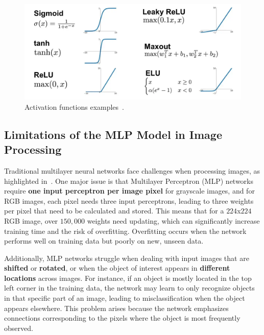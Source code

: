 \begin{figure}[!htb]
    \centering
    \includegraphics[scale=0.4]{Images/activation-functions.png}
    \caption{Activation functions examples~\cite{ActivationFunctionsImage}.}
    \label{fig:activFun}
\end{figure}


\subsection{Limitations of the MLP Model in Image Processing}
\label{ssec:MLPLimitations}

Traditional multilayer neural networks face challenges when processing images, as highlighted in~\cite{TDS-NNCons}. One major issue is that Multilayer Perceptron (MLP) networks require \textbf{one input perceptron per image pixel} for grayscale images, and for RGB images,  each pixel needs three input perceptrons, leading to three weights per pixel that need to be calculated and stored. This means that for a $224$x$224$ RGB image, over $150,000$ weights need updating, which can significantly increase training time and the risk of overfitting. Overfitting occurs when the network performs well on training data but poorly on new, unseen data.

Additionally, MLP networks struggle when dealing with input images that are \textbf{shifted} or \textbf{rotated}, or when the object of interest appears in \textbf{different locations} across images. For instance, if an object is mostly located in the top left corner in the training data, the network may learn to only recognize objects in that specific part of an image, leading to misclassification when the object appears elsewhere. This problem arises because the network emphasizes connections corresponding to the pixels where the object is most frequently observed.

